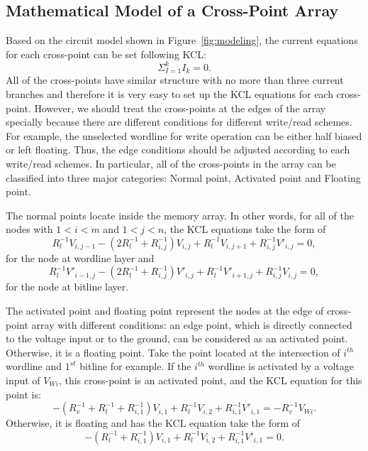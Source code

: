 \subsection{Mathematical Model of a Cross-Point Array}
Based on the circuit model shown in Figure~\ref{fig:modeling}, the current equations for each cross-point can be set following KCL:
\begin{equation}
  {\Sigma}_{I=1}^kI_k=0.
\end{equation}
 All of the cross-points have similar structure with no more than three current branches and therefore it is very easy to set up the KCL equations for each cross-point. However, we should treat the cross-points at the edges of the array specially because there are different conditions for different write/read schemes. For example, the unselected wordline for write operation can be either half biased or left floating. Thus, the edge conditions should be adjusted according to each write/read schemes. In particular, all of the cross-points in the array can be classified into three major categories: Normal point, Activated point and Floating point.

The normal points locate inside the memory array. In other words, for all of the nodes with $1<i<m$ and $1<j<n$, the KCL equations take the form of
\begin{equation}\label{equ:KCL1}
R_l^{-1}V_{i,j-1} -(2R_l^{-1}+R_{i,j}^{-1})V_{i,j}+ R_l^{-1}V_{i,j+1}+R_{i,j}^{-1}V'_{i,j}=0,
\end{equation}
for the node at wordline layer and
\begin{equation}\label{equ:KCL2}
R_l^{-1}V'_{i-1,j} -(2R_l^{-1}+R_{i,j}^{-1})V'_{i,j}+ R_l^{-1}V'_{i+1,j}+R_{i,j}^{-1}V_{i,j}=0,
\end{equation}
for the node at bitline layer.

The activated point and floating point represent the nodes at the edge of cross-point array with different conditions: an edge point, which is directly connected to the voltage input or to the ground, can be considered as an activated point. Otherwise, it is a floating point. Take the point located at the intersection of $i^{th}$ wordline and $1^{st}$ bitline for example. If the $i^{th}$ wordline is activated by a voltage input of $V_{Wi}$, this cross-point is an activated point, and the KCL equation for this point is:
\begin{equation}\label{equ:KCL3}
-(R_v^{-1}+R_l^{-1}+R_{i,1}^{-1})V_{i,1}+ R_l^{-1}V_{i,2}+R_{i,1}^{-1}V'_{i,1}=-R_v^{-1}V_{Wi}.
\end{equation}
Otherwise, it is floating and has the KCL equation take the form of
\begin{equation}\label{equ:KCL4}
-(R_l^{-1}+R_{i,1}^{-1})V_{i,1}+ R_l^{-1}V_{i,2}+R_{i,1}^{-1}V'_{i,1}=0.
\end{equation}

